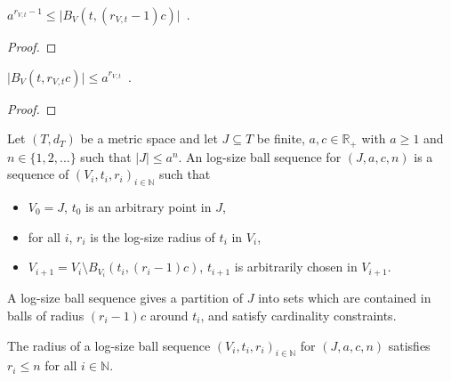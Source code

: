 \begin{lemma}\label{lem:card_logSizeRadius_ge}
  \mathlibok
$a^{r_{V,t}-1} \le \vert B_V(t, (r_{V,t}-1)c) \vert$~.
\end{lemma}

\begin{proof}\leanok

\end{proof}


\begin{lemma}\label{lem:card_logSizeRadius_le}
  \mathlibok
$\vert B_V(t, r_{V,t}c) \vert \le a^{r_{V,t}}$~.
\end{lemma}

\begin{proof}\leanok

\end{proof}


\begin{definition}\label{def:logSizeBallSequence}
  \mathlibok
Let $(T,d_T)$ be a metric space and let $J \subseteq T$ be finite, $a,c \in \mathbb R_+$ with $a \ge 1$ and $n \in \{1, 2, ...\}$ such that $|J| \le a^n$.
An log-size ball sequence for $(J, a, c, n)$ is a sequence of $(V_i, t_i, r_i)_{i \in \mathbb{N}}$ such that
\begin{itemize}
  \item $V_0 = J$, $t_0$ is an arbitrary point in $J$,
  \item for all $i$, $r_i$ is the log-size radius of $t_i$ in $V_i$,
  \item $V_{i+1} = V_i \setminus B_{V_i}(t_i, (r_i - 1)c)$, $t_{i+1}$ is arbitrarily chosen in $V_{i+1}$.
\end{itemize}
\end{definition}

A log-size ball sequence gives a partition of $J$ into sets which are contained in balls of radius $(r_i - 1)c$ around $t_i$, and satisfy cardinality constraints.


\begin{lemma}\label{lem:logSizeRadius_logSizeBallSequence_le}
  \mathlibok
The radius of a log-size ball sequence $(V_i, t_i, r_i)_{i \in \mathbb{N}}$ for $(J, a, c, n)$ satisfies $r_i \le n$ for all $i \in \mathbb{N}$.
\end{lemma}

